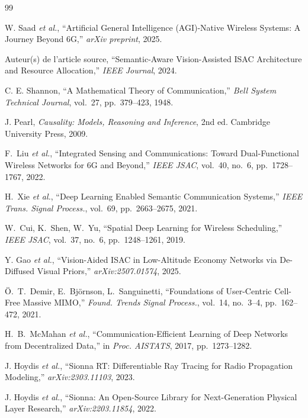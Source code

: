 \documentclass[12pt,a4paper,titlepage]{article}
\begin{document}
\newpage
\begin{thebibliography}{99}

W. Saad \textit{et al.},
``Artificial General Intelligence (AGI)-Native Wireless Systems: A Journey Beyond 6G,''
\textit{arXiv preprint}, 2025.

Auteur(s) de l'article source,
``Semantic-Aware Vision-Assisted ISAC Architecture and Resource Allocation,''
\textit{IEEE Journal}, 2024.

C. E. Shannon,
``A Mathematical Theory of Communication,''
\textit{Bell System Technical Journal}, vol.~27, pp.~379--423, 1948.

J. Pearl,
\textit{Causality: Models, Reasoning and Inference}, 2nd ed.
Cambridge University Press, 2009.

F.~Liu \textit{et al.},
``Integrated Sensing and Communications: Toward Dual-Functional Wireless Networks for 6G and Beyond,''
\textit{IEEE JSAC}, vol.~40, no.~6, pp.~1728--1767, 2022.

H.~Xie \textit{et al.},
``Deep Learning Enabled Semantic Communication Systems,''
\textit{IEEE Trans. Signal Process.}, vol.~69, pp.~2663--2675, 2021.

W.~Cui, K.~Shen, W.~Yu,
``Spatial Deep Learning for Wireless Scheduling,''
\textit{IEEE JSAC}, vol.~37, no.~6, pp.~1248--1261, 2019.

Y. Gao \textit{et al.},
``Vision-Aided ISAC in Low-Altitude Economy Networks via De-Diffused Visual Priors,''
\textit{arXiv:2507.01574}, 2025.

Ö.~T.~Demir, E.~Björnson, L.~Sanguinetti,
``Foundations of User-Centric Cell-Free Massive MIMO,''
\textit{Found. Trends Signal Process.}, vol.~14, no.~3--4, pp.~162--472, 2021.

H.~B.~McMahan \textit{et al.},
``Communication-Efficient Learning of Deep Networks from Decentralized Data,''
in \textit{Proc. AISTATS}, 2017, pp.~1273--1282.

J. Hoydis \textit{et al.},
``Sionna RT: Differentiable Ray Tracing for Radio Propagation Modeling,''
\textit{arXiv:2303.11103}, 2023.

J. Hoydis \textit{et al.},
``Sionna: An Open-Source Library for Next-Generation Physical Layer Research,''
\textit{arXiv:2203.11854}, 2022.


\end{thebibliography}
\end{document}

